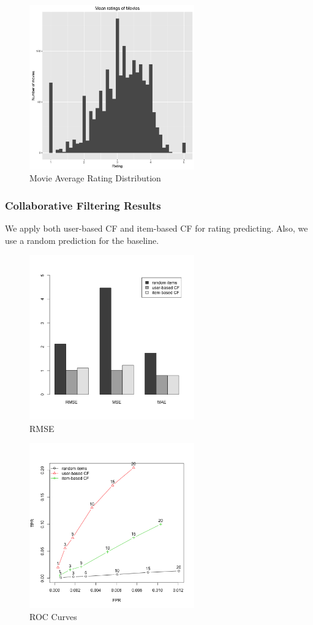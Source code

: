 \documentclass[conference]{IEEEtran}
\begin{document}
\begin{figure}
	\centering
	\includegraphics[width=2.8in]{movie_rating.png}
	\caption{Movie Average Rating Distribution}
	\label{fig:side:a}
\end{figure}

\subsubsection{Collaborative Filtering Results}
We apply both user-based CF and item-based CF for rating predicting. Also, we use a random prediction for the baseline.
\begin{figure}
	\centering
	\includegraphics[width=2.8in]{RMSE.png}
	\caption{RMSE}
	\label{fig:side:a}
\end{figure}
\begin{figure}
	\centering
	\includegraphics[width=2.8in]{ROC.png}
	\caption{ROC Curves}
	\label{fig:side:a}
\end{figure}
\end{document}
